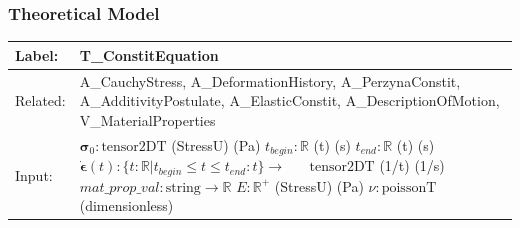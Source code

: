 \documentclass[t,12pt,numbers,fleqn]{beamer}
\newcommand{\colAwidth}{0.15\textwidth}
\newcommand{\colBwidth}{0.7\textwidth}
\begin{document}

\begin{frame}

\frametitle{Theoretical Model}

\begin{minipage}{\textwidth}
\begin{tabular}{| p{\colAwidth} | p{\colBwidth}|}
\hline
\rowcolor[gray]{0.9}
Label: & T\_ConstitEquation\\
\hline
Related: & {A\_CauchyStress}, {A\_DeformationHistory}, {A\_PerzynaConstit}, {A\_AdditivityPostulate},
{A\_ElasticConstit}, {A\_DescriptionOfMotion}, {V\_MaterialProperties}\\
\hline
Input: & $\bm{\sigma}_0: \mbox{tensor2DT}$ (StressU) (Pa)\newline
$t_{\mathit{begin}}: \mathbb{R}$ (t) (s) \newline
$t_{\mathit{end}}: \mathbb{R} $ (t) (s) \newline
$\dot{\bm{\epsilon}}(t) : \{ t: \mathbb{R} | t_{\mathit{begin}} \leq t \leq t_{\mathit{end}} : t \} \rightarrow
\mbox{   } \mbox{   } \mbox{  tensor2DT}$ (1/t) (1/s)\newline
$\mathit{mat\_prop\_val}: \mbox{string} \rightarrow \mathbb{R}$\newline
$E: \mathbb{R}^{+}$ (StressU) (Pa)\newline
$\nu: \mbox{poissonT}$ (dimensionless)
\\
\hline
\end{tabular}
\end{minipage}

\end{frame}

\end{document}
